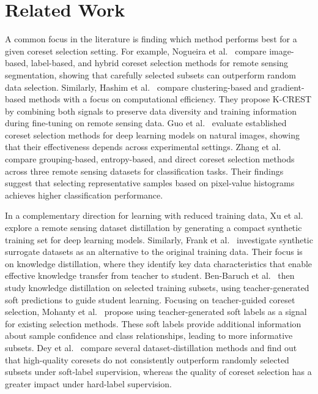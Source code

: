 \documentclass[conference]{IEEEtran}
\begin{document}
\section{Related Work}
A common focus in the literature is finding which method performs best for a given coreset selection setting.
For example, Nogueira et al.~\cite{nogueira2026core} compare image-based, label-based, and hybrid coreset selection methods for remote sensing segmentation, showing that carefully selected subsets can outperform random data selection.
Similarly, Hashim et al.~\cite{hashim2026coreset} compare clustering-based and gradient-based methods with a focus on computational efficiency.
They propose K-CREST by combining both signals to preserve data diversity and training information during fine-tuning on remote sensing data.
Guo et al.~\cite{guo2022deepcore} evaluate established coreset selection methods for deep learning models on natural images, showing that their effectiveness depends across experimental settings.
Zhang et al.~\cite{zhang2023comparing} compare grouping-based, entropy-based, and direct coreset selection methods across three remote sensing datasets for classification tasks.
Their findings suggest that selecting representative samples based on pixel-value histograms achieves higher classification performance.

In a complementary direction for learning with reduced training data, Xu et al.~\cite{xu2026towards} explore a remote sensing dataset distillation by generating a compact synthetic training set for deep learning models.
Similarly, Frank et al.~\cite{frank2025makes} investigate synthetic surrogate datasets as an alternative to the original training data. Their focus is on knowledge distillation, where they identify key data characteristics that enable effective knowledge transfer from teacher to student.
Ben-Baruch et al.~\cite{ben2024distilling} then study knowledge distillation on selected training subsets, using teacher-generated soft predictions to guide student learning.
Focusing on teacher-guided coreset selection, Mohanty et al.~\cite{mohanty2026enhancing} propose using teacher-generated soft labels as a signal for existing selection methods.
These soft labels provide additional information about sample confidence and class relationships, leading to more informative subsets.
Dey et al.~\cite{dey2026rethinking} compare several dataset-distillation methods and find out that high-quality coresets do not consistently outperform randomly selected subsets under soft-label supervision, whereas the quality of coreset selection has a greater impact under hard-label supervision.
\end{document}
